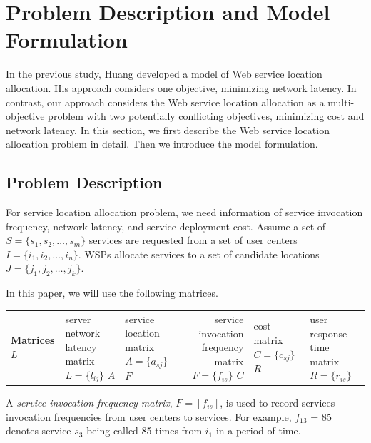 \section{Problem Description and Model Formulation}
In the previous study, Huang \cite{EnhancedGenetic} developed a model of Web service location allocation. His approach considers one objective, minimizing network latency. In contrast,
our approach considers the Web service location allocation as a multi-objective problem with two potentially conflicting objectives, minimizing cost and network latency. In this section, we first describe the Web service location allocation problem in detail.  Then we introduce the model formulation.

\subsection{Problem Description}
For service location allocation problem, we need information of service invocation frequency, network latency, and service deployment cost.
Assume a set of $S = \{ s_{1}, s_{2}, \dots,  s_{m}\}$ services are
requested from a set of user centers $I = \{ i_{1}, i_{2}, \dots,  i_{n} \}$. 
WSPs allocate services to a set of candidate locations $J = \{ j_{1}, j_{2}, \dots,  j_{k} \}$.

In this paper, we will use the following matrices.
\begin{center}
{
	\footnotesize
	\begin{tabular}{l*{2}{l}r}
		\hline
		\textbf{Matrices} \cr
		$L$ & server network latency matrix $L = \{l_{ij}\}$ \cr
		$A$ & service location matrix $A = \{a_{sj}\}$ \cr
		$F$ & service invocation frequency matrix $F = \{f_{is}\}$ \cr
		$C$ & cost matrix $C = \{c_{sj}\}$ \cr
		$R$ & user response time matrix $R = \{r_{is}\}$ \cr
		\hline
	\end{tabular}
}
\end{center}

A \emph{service invocation frequency matrix}, $F= [f_{is}]$, is used to record services invocation frequencies from user centers to services. For example, $f_{13}$ = 85 denotes service $s_{3}$ being called 85 times from $i_1$ in a period of time.


